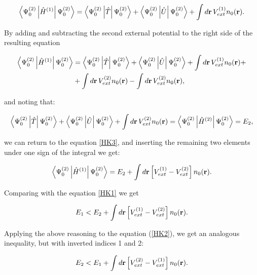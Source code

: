 \begin{equation}
\label{HK3}
\left<\Psi_0^{(2)}\left|\hat{H}^{(1)}\right|\Psi_0^{(2)}\right>=\left<\Psi_0^{(2)}\left|\hat{T}\right|\Psi_0^{(2)}\right>+\left<\Psi_0^{(2)}\left|\hat{U}\right|\Psi_0^{(2)}\right>+\int d\mathbf{r}\,V_{ext}^{(1)}n_0(\mathbf{r}).
\end{equation}

By adding and subtracting the second external potential to the right side of the resulting equation

\begin{equation}
\label{HK4}
\begin{aligned}
\left<\Psi_0^{(2)}\left|\hat{H}^{(1)}\right|\Psi_0^{(2)}\right>
&=\left<\Psi_0^{(2)}\left|\hat{T}\right|\Psi_0^{(2)}\right>+\left<\Psi_0^{(2)}\left|\hat{U}\right|\Psi_0^{(2)}\right>+\int d\mathbf{r}\,V_{ext}^{(1)}n_0(\mathbf{r})+\\
&+\int d\mathbf{r}\,V_{ext}^{(2)}n_0(\mathbf{r})-\int d\mathbf{r}\,V_{ext}^{(2)}n_0(\mathbf{r}),
\end{aligned}
\end{equation}

and noting that:

\begin{equation}
\label{HK5}
\left<\Psi_0^{(2)}\left|\hat{T}\right|\Psi_0^{(2)}\right>+\left<\Psi_0^{(2)}\left|\hat{U}\right|\Psi_0^{(2)}\right>+\int d\mathbf{r}\,V_{ext}^{(2)}n_0(\mathbf{r})=\left<\Psi_0^{(2)}\left|\hat{H}^{(2)}\right|\Psi_0^{(2)}\right>=E_2,
\end{equation}

we can return to the equation \ref{HK3}, and inserting the remaining two elements under one sign of the integral we get:

\begin{equation}
\label{HK6}
\left<\Psi_0^{(2)}\left|\hat{H}^{(1)}\right|\Psi_0^{(2)}\right>=E_2+\int d\mathbf{r}\left[V_{ext}^{(1)}-V_{ext}^{(2)}\right]n_0(\mathbf{r}).
\end{equation}

Comparing with the equation \ref{HK1} we get

\begin{equation}
\label{HK7}
E_1<E_2+\int d\mathbf{r}\left[V_{ext}^{(1)}-V_{ext}^{(2)}\right]n_0(\mathbf{r}).
\end{equation}

Applying the above reasoning to the equation (\ref{HK2}), we get an analogous inequality, but with inverted indices 1 and 2:

\begin{equation}
\label{HK8}
E_2<E_1+\int d\mathbf{r}\left[V_{ext}^{(2)}-V_{ext}^{(1)}\right]n_0(\mathbf{r}).
\end{equation}


